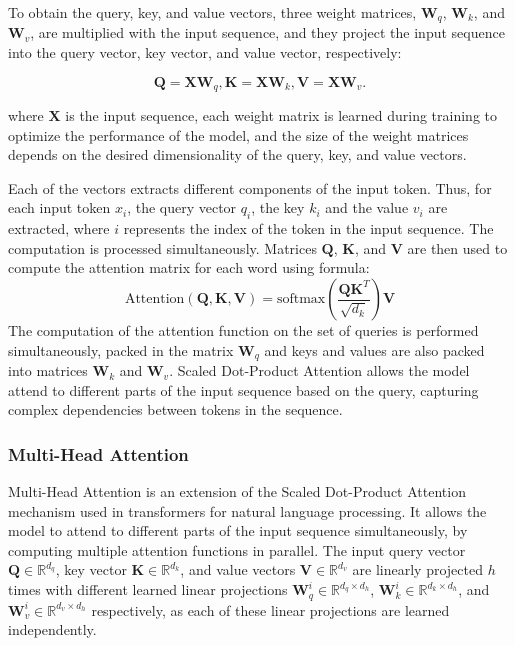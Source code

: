 To obtain the query, key, and value vectors, three weight matrices, $\boldsymbol{W}_q$, $\boldsymbol{W}_k$, and $\boldsymbol{W}_v$, are multiplied with the input sequence, and they project the input sequence into the query vector, key vector, and value vector, respectively:

\begin{equation}
    \boldsymbol{Q} = \boldsymbol{XW}_q, \boldsymbol{K} = \boldsymbol{XW}_k, \boldsymbol{V} = \boldsymbol{XW}_v.
\end{equation}

where $\boldsymbol{X}$ is the input sequence, each weight matrix is learned during training to optimize the performance of the model, and the size of the weight matrices depends on the desired dimensionality of the query, key, and value vectors.

Each of the vectors extracts different components of the input token. Thus, for each input token $x_i$, the query vector $q_i$, the key $k_i$ and the value $v_i$ are extracted, where $i$ represents the index of the token in the input sequence. The computation is processed simultaneously. Matrices $\boldsymbol{Q}$, $\boldsymbol{K}$, and $\boldsymbol{V}$ are then used to compute the attention matrix for each word using formula:
\begin{equation}
    \text{Attention}(\boldsymbol{Q},\boldsymbol{K},\boldsymbol{V}) = \text{softmax}(\frac{\boldsymbol{QK}^T}{\sqrt{d_k}})\boldsymbol{V}
\end{equation}
\noindent The computation of the attention function on the set of queries is performed simultaneously, packed in the matrix $\boldsymbol{W}_q$ and keys and values are also packed into matrices $\boldsymbol{W}_k$ and $\boldsymbol{W}_v$. 
Scaled Dot-Product Attention allows the model attend to different parts of the input sequence based on the query, capturing complex dependencies between tokens in the sequence.

\subsubsection*{Multi-Head Attention}
Multi-Head Attention is an extension of the Scaled Dot-Product Attention mechanism used in transformers for natural language processing. It allows the model to attend to different parts of the input sequence simultaneously, by computing multiple attention functions in parallel. The input query vector $\boldsymbol{Q} \in \mathbb{R}^{d_q}$, key vector $\boldsymbol{K} \in \mathbb{R}^{d_k}$, and value vectors $\boldsymbol{V} \in \mathbb{R}^{d_v}$ are linearly projected $h$ times with different learned linear projections $\boldsymbol{W}_q^i \in \mathbb{R}^{d_q \times d_h}$, $\boldsymbol{W}_k^i \in \mathbb{R}^{d_k \times d_h}$, and $\boldsymbol{W}_v^i \in \mathbb{R}^{d_v \times d_h}$ respectively, as each of these linear projections are learned independently.

